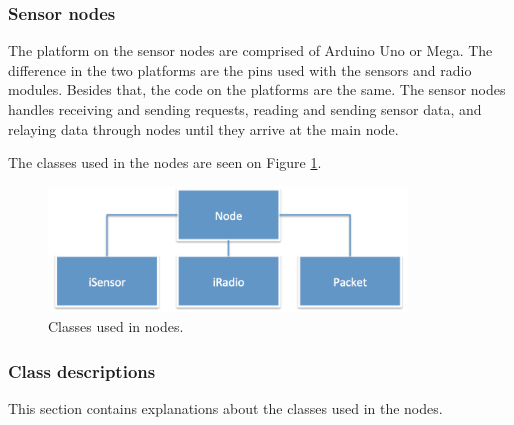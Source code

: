 \subsubsection*{Sensor nodes}
The platform on the sensor nodes are comprised of Arduino Uno or Mega. The difference in the two platforms are the pins used with the sensors and radio modules. Besides that, the code on the platforms are the same. The sensor nodes handles receiving and sending requests, reading and sending sensor data, and relaying data through nodes until they arrive at the main node. 

The classes used in the nodes are seen on Figure \ref{fig:nodeClass}.
\begin{figure}[h!]
\centering
\includegraphics[width=0.85\textwidth]{chapters/implementation/figures/nodeClass.png}
\caption{Classes used in nodes.}
\label{fig:nodeClass}
\end{figure}


\subsubsection*{Class descriptions}
This section contains explanations about the classes used in the nodes.

